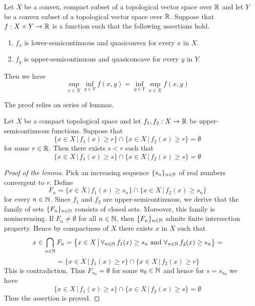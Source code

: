 \begin{theorem}\label{theorem:sionsminimax}
Let $X$ be a convex, compact subset of a topological vector space over ${\mathbb R}$ and let $Y$ be a convex subset of a topological vector space over ${\mathbb R}$. Suppose that $f:X\times Y\rightarrow {\mathbb R}$ is a function such that the following assertions hold.
\begin{enumerate}[label=\emph{\textbf{(\arabic*)}}, leftmargin=1.5em]
\item $f_x$ is lower-semicontinuous and quasiconvex for every $x$ in $X$.
\item $f_y$ is upper-semicontinuous and quasiconcave for every $y$ in $Y$.
\end{enumerate}
Then we have
$$\sup_{x\in X}\inf_{y\in Y}f(x,y) = \inf_{y\in Y}\sup_{x\in X}f(x,y)$$
\end{theorem}
\noindent
The proof relies on series of lemmas.

\begin{lemma}\label{lemma:levelcangodown}
Let $X$ be a compact topological space and let $f_1,f_2:X\rightarrow {\mathbb R}$ be upper-semicontinuous functions. Suppose that
$$\big\{x\in X\,\big|\,f_{1}(x)\geq r\big\}\cap \big\{x\in X\,\big|\,f_{2}(x)\geq r\big\}=\emptyset$$
for some $r\in {\mathbb R}$. Then there exists $s< r$ such that
$$\big\{x\in X\,\big|\,f_{1}(x)\geq s\big\}\cap \big\{x\in X\,\big|\,f_{2}(x)\geq s\big\}=\emptyset$$
\end{lemma}
\begin{proof}[Proof of the lemma]
Pick an increasing sequence $\{s_n\}_{n\in {\mathbb N}}$ of real numbers convergent to $r$. Define
$$F_n = \big\{x\in X\,\big|\,f_{1}(x)\geq s_n\big\}\cap \big\{x\in X\,\big|\,f_{2}(x)\geq s_n\big\}$$
for every $n\in {\mathbb N}$. Since $f_{1}$ and $f_{2}$ are upper-semicontinuous, we derive that the family of sets $\{F_n\}_{n\in {\mathbb N}}$ consists of closed sets. Moreover, this family is nonincreasing. If $F_n\neq \emptyset$ for all $n\in {\mathbb N}$, then $\{F_n\}_{n\in {\mathbb N}}$ admits finite intersection property. Hence by compactness of $X$ there exists $x$ in $X$ such that
$$x\in \bigcap_{n\in {\mathbb N}}F_n = \big\{x\in X\,\big|\,\forall_{n\in {\mathbb N}}\,f_1(x)\geq s_n\mbox{ and }\forall_{n\in {\mathbb N}}\,f_2(x)\geq s_n\big\} =$$
$$= \big\{x\in X\,\big|\,f_{1}(x)\geq r\big\}\cap \big\{x\in X\,\big|\,f_{2}(x)\geq r\big\}$$
This is contradiction. Thus $F_{n_0}=\emptyset$ for some $n_0\in {\mathbb N}$ and hence for $s = s_{n_0}$ we have
$$\big\{x\in X\,\big|\,f_{1}(x)\geq s\big\}\cap \big\{x\in X\,\big|\,f_{2}(x)\geq s\big\} = \emptyset$$
Thus the assertion is proved.
\end{proof}

